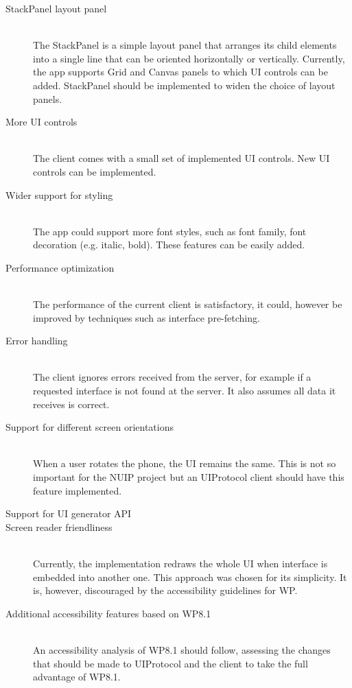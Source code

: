 \begin{description}
  \item[StackPanel layout panel] \hfill \\
  The StackPanel is a simple layout panel that arranges its child elements into a single line that can be oriented horizontally or vertically. Currently, the app supports Grid and Canvas panels to which UI controls can be added. StackPanel should be implemented to widen the choice of layout panels. 
  \item[More UI controls] \hfill \\
  The client comes with a small set of implemented UI controls. New UI controls can be implemented.
  \item[Wider support for styling] \hfill \\
  The app could support more font styles, such as font family, font decoration (e.g. italic, bold). These features can be easily added.
  \item[Performance optimization] \hfill \\
  The performance of the current client is satisfactory, it could, however be improved by techniques such as interface pre-fetching.
  \item[Error handling] \hfill \\
  The client ignores errors received from the server, for example if a requested interface is not found at the server. It also assumes all data it receives is correct.
  \item[Support for different screen orientations] \hfill \\
When a user rotates the phone, the UI remains the same. This is not so important for the NUIP project but an UIProtocol client should have this feature implemented.
\item[Support for UI generator API] \hfill 
\item[Screen reader friendliness] \hfill \\
Currently, the implementation redraws the whole UI when interface is embedded into another one. This approach was chosen for its simplicity. It is, however, discouraged by the accessibility guidelines for WP.
\item[Additional accessibility features based on WP8.1] \hfill \\
An accessibility analysis of WP8.1 should follow, assessing the changes that should be made to UIProtocol and the client to take the full advantage of WP8.1.
\end{description}
